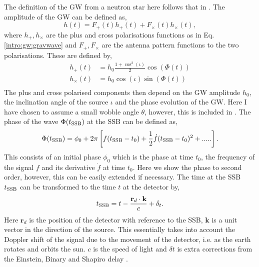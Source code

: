 The definition of the \gls{GW} from a neutron star here follows that in \citep{riles2017RecentSearches,schutz1998DataAnalysis,dupuis2005BayesianEstimation}. The amplitude of the \gls{GW} can be defined as,
\begin{equation}
\label{intro:cw:ht}
h(t) = F_+(t)h_{+}(t) +F_{\times}(t)h_{\times}(t),
\end{equation}
where $h_{+},h_{\times}$ are the plus and cross polarisations functions as in Eq.\ref{intro:gw:gravwave} and $F_{+},F_{\times}$ are the antenna pattern functions to the two polarisations.
These are defined by,
\begin{equation}
\label{intro:cw:amplitudes}
    \begin{split}
        h_{+}(t) &=  h_0 \frac{1 + \cos^2{(\iota)}}{2}\cos{\left(\Phi(t)\right)} \\
        h_{\times}(t) &= h_0  \cos{(\iota)} \sin{\left( \Phi(t)\right) } \\
    \end{split}
\end{equation}
The plus and cross polarised components then depend on the \gls{GW} amplitude $h_0$, the inclination angle of the source $\iota$ and the phase evolution of the \gls{GW}. Here I have chosen to assume a small wobble angle $\theta$, however, this is included in \citep{schutz1998DataAnalysis}. The phase of the wave $\Phi(t_{{\rm SSB}})$ at the \gls{SSB} can be defined as,
\begin{equation}
\label{searchcw:model:phase}
    \Phi(t_{{\rm SSB}}) = \phi_0 + 2\pi\left[ f(t_{{\rm SSB}} - t_0) + \frac{1}{2} \dot{f} (t_{{\rm SSB}} - t_0)^2 + .....\right] .
\end{equation}
This consists of an initial phase $\phi_0$ which is the phase at time $t_0$, the frequency of the signal $f$ and its derivative ${\dot{f}}$ at time $t_0$. Here we show the phase to second order, however, this can be easily extended if necessary. 
The time at the \gls{SSB} $t_{{\rm SSB}}$ can be transformed to the time $t$ at the detector by,
\begin{equation}
t_{{\rm SSB}} = t - \frac{\mathbf{r}_d \cdot \mathbf{k}}{c} + \delta_t.
\end{equation}
Here $\mathbf{r}_d$ is the position of the detector with reference to the \gls{SSB}, $\mathbf{k}$ is a unit vector in the direction of the source. This essentially takes into account the Doppler shift of the signal due to the movement of the detector, i.e. as the earth rotates and orbits the sun. $c$ is the speed of light and $\delta t$ is extra corrections from the Einstein, Binary and Shapiro delay \citep{}.
